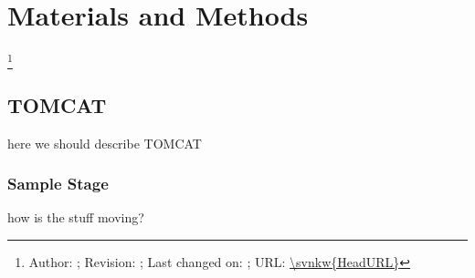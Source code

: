 \section{Materials and Methods}

\footnote{Author: \svnauthor; Revision: \svnrev; Last changed on: \svndate; URL: \url{\svnkw{HeadURL}}}

\subsection{TOMCAT}
here we should describe TOMCAT
\subsubsection{Sample Stage}
how is the stuff moving?
